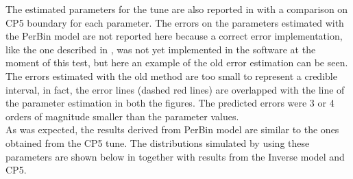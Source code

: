 \noindent The estimated parameters for the tune are also reported in  with a comparison on CP5 boundary for each parameter. The errors on the parameters estimated with the PerBin model are not reported here because a correct error implementation, like the one described in , was not yet implemented in the software at the moment of this test, but here an example of the old error estimation can be seen. The errors estimated with the old method are too small to represent a credible interval, in fact, the error lines (dashed red lines) are overlapped with the line of the parameter estimation in both the figures. The predicted errors were 3 or 4 orders of magnitude smaller than the parameter values. 
\\
As was expected, the results derived from PerBin model are similar to the ones obtained from the CP5 tune. The distributions simulated by using these  parameters are shown below  in  together with results from the Inverse model and CP5.


\medskip

